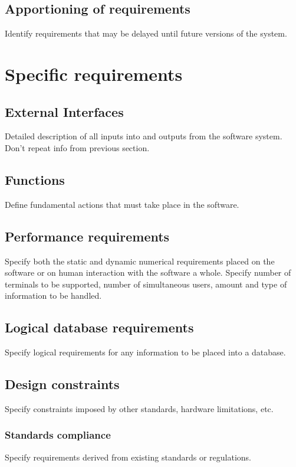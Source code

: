 \documentclass[letterpaper,10pt,draftclsnofoot,onecolumn,titlepage]{IEEEtran}
\begin{document}
	\subsection{Apportioning of requirements}
	Identify requirements that may be delayed until future versions of the system.

	\section{Specific requirements}
	\subsection{External Interfaces}
	Detailed description of all inputs into and outputs from the software system. Don't repeat info from previous section.

	\subsection{Functions}
	Define fundamental actions that must take place in the software.

	\subsection{Performance requirements}
	Specify both the static and dynamic numerical requirements placed on the software or on human interaction with the software a whole.
	Specify number of terminals to be supported, number of simultaneous users, amount and type of information to be handled.

	\subsection{Logical database requirements}
	Specify logical requirements for any information to be placed into a database.

	\subsection{Design constraints}
	Specify constraints imposed by other standards, hardware limitations, etc.

	\subsubsection{Standards compliance}
	Specify requirements derived from existing standards or regulations.
\end{document}
